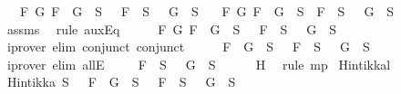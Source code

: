 \begin{isabellebody}
\ \ {\isasymand}\ {\isacharparenleft}{\isasymforall}F\ G{\isachardot}\ \isactrlbold {\isasymnot}{\isacharparenleft}F\ \isactrlbold {\isasymor}\ G{\isacharparenright}\ {\isasymin}\ S\ {\isasymlongrightarrow}\ \isactrlbold {\isasymnot}\ F\ {\isasymin}\ S\ {\isasymand}\ \isactrlbold {\isasymnot}\ G\ {\isasymin}\ S{\isacharparenright}\isanewline
\ \ {\isasymand}\ {\isacharparenleft}{\isasymforall}F\ G{\isachardot}\ \isactrlbold {\isasymnot}{\isacharparenleft}F\ \isactrlbold {\isasymrightarrow}\ G{\isacharparenright}\ {\isasymin}\ S\ {\isasymlongrightarrow}\ F\ {\isasymin}\ S\ {\isasymand}\ \isactrlbold {\isasymnot}\ G\ {\isasymin}\ S{\isacharparenright}{\isachardoublequoteclose}\isanewline
\ \ \ \isamarkupfalse%
\ assms\ \isamarkupfalse%
\ {\isacharparenleft}rule\ auxEq{\isacharparenright}\isanewline
\ \ \isamarkupfalse%
\ \isamarkupfalse%
\ {\isachardoublequoteopen}{\isasymforall}F\ G{\isachardot}\ \isactrlbold {\isasymnot}{\isacharparenleft}F\ \isactrlbold {\isasymor}\ G{\isacharparenright}\ {\isasymin}\ S\ {\isasymlongrightarrow}\ \isactrlbold {\isasymnot}\ F\ {\isasymin}\ S\ {\isasymand}\ \isactrlbold {\isasymnot}\ G\ {\isasymin}\ S{\isachardoublequoteclose}\isanewline
\ \ \ \ \isamarkupfalse%
\ {\isacharparenleft}iprover\ elim{\isacharcolon}\ conjunct{}\ conjunct{}{\isacharparenright}\isanewline
\ \ \isamarkupfalse%
\ \isamarkupfalse%
\ {\isachardoublequoteopen}\isactrlbold {\isasymnot}{\isacharparenleft}F\ \isactrlbold {\isasymor}\ G{\isacharparenright}\ {\isasymin}\ S\ {\isasymlongrightarrow}\ \isactrlbold {\isasymnot}\ F\ {\isasymin}\ S\ {\isasymand}\ \isactrlbold {\isasymnot}\ G\ {\isasymin}\ S{\isachardoublequoteclose}\isanewline
\ \ \ \ \isamarkupfalse%
\ {\isacharparenleft}iprover\ elim{\isacharcolon}\ allE{\isacharparenright}\isanewline
\ \ \isamarkupfalse%
\ {\isachardoublequoteopen}\isactrlbold {\isasymnot}\ F\ {\isasymin}\ S\ {\isasymand}\ \isactrlbold {\isasymnot}\ G\ {\isasymin}\ S{\isachardoublequoteclose}\isanewline
\ \ \ \ \isamarkupfalse%
\ H\ \isamarkupfalse%
\ {\isacharparenleft}rule\ mp{\isacharparenright}\isanewline
{}\isamarkupfalse%
%
\endisatagproof
{\isafoldproof}%
%
\isadelimproof
\isanewline
%
\endisadelimproof
\isanewline
{}\isamarkupfalse%
\ Hintikka{\isacharunderscore}l{}{\isacharcolon}\ \isanewline
\ {\isachardoublequoteopen}Hintikka\ S\ {\isasymLongrightarrow}\ {\isacharparenleft}\ \isactrlbold {\isasymnot}{\isacharparenleft}F\ \isactrlbold {\isasymor}\ G{\isacharparenright}\ {\isasymin}\ S\ {\isasymlongrightarrow}\ \isactrlbold {\isasymnot}\ F\ {\isasymin}\ S\ {\isasymand}\ \isactrlbold {\isasymnot}\ G\ {\isasymin}\ S{\isacharparenright}{\isachardoublequoteclose}\isanewline

\end{isabellebody}
